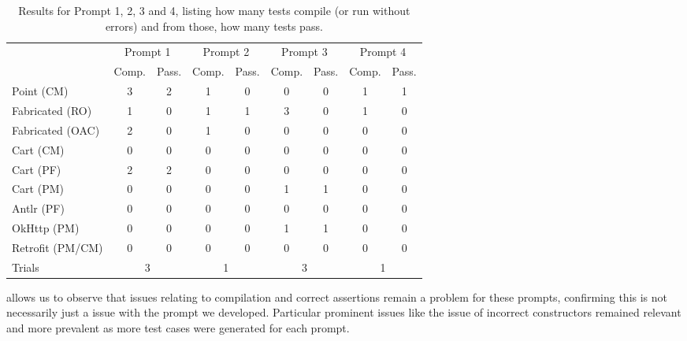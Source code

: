 \begin{table}[t]
    \centering
    \begin{tabular}{@{\extracolsep{\fill}} l*{8}{c}} \toprule
                      & \multicolumn{2}{c}{Prompt 1} & \multicolumn{2}{c}{Prompt 2} & \multicolumn{2}{c}{Prompt 3} & \multicolumn{2}{c}{Prompt 4}\\
                      & Comp. & Pass. & Comp. & Pass. & Comp. & Pass. & Comp. & Pass. \\
    \midrule
    Point (CM)       & 3 & 2 & 1 & 0 & 0 & 0 & 1 & 1 \\
    Fabricated (RO)  & 1 & 0 & 1 & 1 & 3 & 0 & 1 & 0 \\
    Fabricated (OAC) & 2 & 0 & 1 & 0 & 0 & 0 & 0 & 0 \\
    Cart (CM)        & 0 & 0 & 0 & 0 & 0 & 0 & 0 & 0 \\
    Cart (PF)        & 2 & 2 & 0 & 0 & 0 & 0 & 0 & 0 \\
    Cart (PM)        & 0 & 0 & 0 & 0 & 1 & 1 & 0 & 0 \\
    Antlr (PF)       & 0 & 0 & 0 & 0 & 0 & 0 & 0 & 0 \\
    OkHttp (PM)      & 0 & 0 & 0 & 0 & 1 & 1 & 0 & 0 \\
    Retrofit (PM/CM) & 0 & 0 & 0 & 0 & 0 & 0 & 0 & 0 \\
    \midrule
    Trials    & \multicolumn{2}{c}{3} & \multicolumn{2}{c}{1} & \multicolumn{2}{c}{3} & \multicolumn{2}{c}{1} \\
    \bottomrule
    \end{tabular}
    \caption{Results for Prompt 1, 2, 3 and 4, listing how many tests compile (or run without errors) and from those, how many tests pass.\label{tab:results:rq3t1}}
\end{table}


 allows us to observe that issues relating to compilation and correct assertions remain
a problem for these prompts, confirming this is not necessarily just a issue with the prompt we developed.
%
Particular prominent issues like the issue of incorrect constructors %
remained relevant
and more prevalent as more test cases were generated for each prompt.

